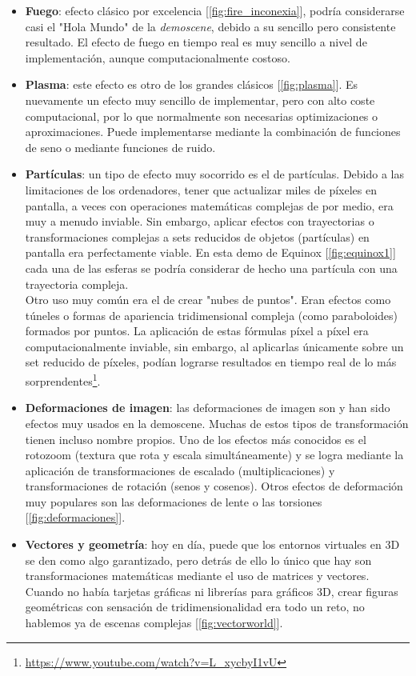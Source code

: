 \begin{itemize}
	\item \textbf{Fuego}: efecto clásico por excelencia [\ref{fig:fire_inconexia}], podría considerarse casi el "Hola Mundo" de la \emph{demoscene}, debido a su sencillo pero consistente resultado. El efecto de fuego en tiempo real es muy sencillo a nivel de implementación, aunque computacionalmente costoso.
	\item \textbf{Plasma}: este efecto es otro de los grandes clásicos [\ref{fig:plasma}]. Es nuevamente un efecto muy sencillo de implementar, pero con alto coste computacional, por lo que normalmente son necesarias optimizaciones o aproximaciones. Puede implementarse mediante la combinación de funciones de seno o mediante funciones de ruido.
	\item \textbf{Partículas}: un tipo de efecto muy socorrido es el de partículas. Debido a las limitaciones de los ordenadores, tener que actualizar miles de píxeles en pantalla, a veces con operaciones matemáticas complejas de por medio, era muy a menudo inviable. Sin embargo, aplicar efectos con trayectorias o transformaciones complejas a sets reducidos de objetos (partículas) en pantalla era perfectamente viable. En esta demo de Equinox [\ref{fig:equinox1}] cada una de las esferas se podría considerar de hecho una partícula con una trayectoria compleja. \\
	Otro uso muy común era el de crear "nubes de puntos". Eran efectos como túneles o formas de apariencia tridimensional compleja (como paraboloides) formados por puntos. La aplicación de estas fórmulas píxel a píxel era computacionalmente inviable, sin embargo, al aplicarlas únicamente sobre un set reducido de píxeles, podían lograrse resultados en tiempo real de lo más sorprendentes\footnote{\url{https://www.youtube.com/watch?v=L_xycbyI1vU}}.
	\item \textbf{Deformaciones de imagen}: las deformaciones de imagen son y han sido efectos muy usados en la demoscene. Muchas de estos tipos de transformación tienen incluso nombre propios. Uno de los efectos más conocidos es el rotozoom (textura que rota y escala simultáneamente) y se logra mediante la aplicación de transformaciones de escalado (multiplicaciones) y transformaciones de rotación (senos y cosenos). Otros efectos de deformación muy populares son las deformaciones de lente o las torsiones [\ref{fig:deformaciones}].
	\item \textbf{Vectores y geometría}: hoy en día, puede que los entornos virtuales en 3D se den como algo garantizado, pero detrás de ello lo único que hay son transformaciones matemáticas mediante el uso de matrices y vectores. Cuando no había tarjetas gráficas ni librerías para gráficos 3D, crear figuras geométricas con sensación de tridimensionalidad era todo un reto, no hablemos ya de escenas complejas [\ref{fig:vectorworld}].

\end{itemize}
